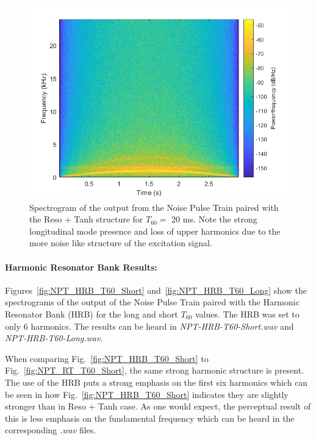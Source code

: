 \documentclass[../main.tex]{subfiles}
\begin{document}
\begin{figure}[h!]
    \centering
    \includegraphics[scale=.60]{./images/plots/NPTResoTanhT60Long.png}
    \caption{Spectrogram of the output from the Noise Pulse Train paired with the Reso + Tanh structure for $T_{60} = $ 20 ms. Note the strong longitudinal mode presence and loss of upper harmonics due to the more noise like structure of the excitation signal.}
    \label{fig:NPT_RT_T60_Long}
\end{figure}

\clearpage

\paragraph{Harmonic Resonator Bank Results:}
Figures~\ref{fig:NPT_HRB_T60_Short} and~\ref{fig:NPT_HRB_T60_Long} show the spectrograms of the output of the Noise Pulse Train paired with the Harmonic Resonator Bank (HRB) for the long and short $T_{60}$ values. The HRB was set to only 6 harmonics. The results can be heard in \emph{NPT-HRB-T60-Short.wav} and \emph{NPT-HRB-T60-Long.wav}.

When comparing Fig.~\ref{fig:NPT_HRB_T60_Short} to Fig.~\ref{fig:NPT_RT_T60_Short}, the same strong harmonic structure is present. The use of the HRB puts a strong emphasis on the first six harmonics which can be seen in how Fig.~\ref{fig:NPT_HRB_T60_Short} indicates they are slightly stronger than in Reso + Tanh case. As one would expect, the perceptual result of this is less emphasis on the fundamental frequency which can be heard in the corresponding \emph{.wav} files.
\end{document}
